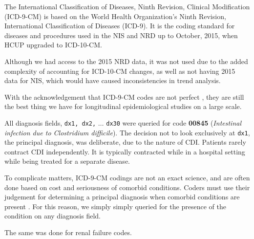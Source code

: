 The International Classification of Diseases, Ninth Revision, Clinical Modification (ICD-9-CM) is based on the World Health Organization's Ninth Revision,
International Classification of Diseases (ICD-9). It is the coding standard for diseases and procedures used in the NIS and NRD up to October, 2015, when
HCUP upgraded to ICD-10-CM. 

Although we had access to the 2015 NRD data, it was not used due to the added complexity of accounting for ICD-10-CM changes, as well as not having 2015
data for NIS, which would have caused inconsistencies in trend analysis. 

With the acknowledgement that ICD-9-CM codes are not perfect \cite{Uchiyama2015}, they are still the best thing we have for longitudinal 
epidemiological studies on a large scale. 

All diagnosis fields, \texttt{dx1, dx2,} $\hdots$ \texttt{dx30} were queried for code \textbf{00845} (\textit{Intestinal infection due to Clostridium difficile}). 
The decision not to look exclusively at \texttt{dx1}, the principal diagnosis, was deliberate, due to the nature of CDI. Patients rarely contract CDI
independently. It is typically contracted while in a hospital setting while being treated for a separate disease. 

To complicate matters, ICD-9-CM codings are not an exact science, and are often done based on cost and seriousness of comorbid conditions. Coders must use
their judgement for determining a principal diagnosis when comorbid conditions are present \cite{Avery2011}. For this reason, we simply simply queried for
the presence of the condition on any diagnosis field. 

The same was done for renal failure codes.

